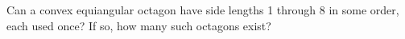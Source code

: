 Can a convex equiangular octagon have side lengths 1 through 8 in some order, each used once? If so, how many such octagons exist?
